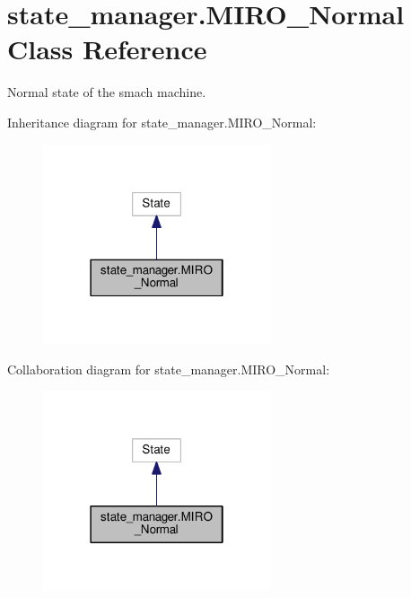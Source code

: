 \hypertarget{classstate__manager_1_1MIRO__Normal}{}\section{state\+\_\+manager.\+M\+I\+R\+O\+\_\+\+Normal Class Reference}
\label{classstate__manager_1_1MIRO__Normal}


Normal state of the smach machine.  




Inheritance diagram for state\+\_\+manager.\+M\+I\+R\+O\+\_\+\+Normal\+:\nopagebreak
\begin{figure}[H]
\begin{center}
\leavevmode
\includegraphics[width=190pt]{classstate__manager_1_1MIRO__Normal__inherit__graph}
\end{center}
\end{figure}


Collaboration diagram for state\+\_\+manager.\+M\+I\+R\+O\+\_\+\+Normal\+:\nopagebreak
\begin{figure}[H]
\begin{center}
\leavevmode
\includegraphics[width=190pt]{classstate__manager_1_1MIRO__Normal__coll__graph}
\end{center}
\end{figure}
